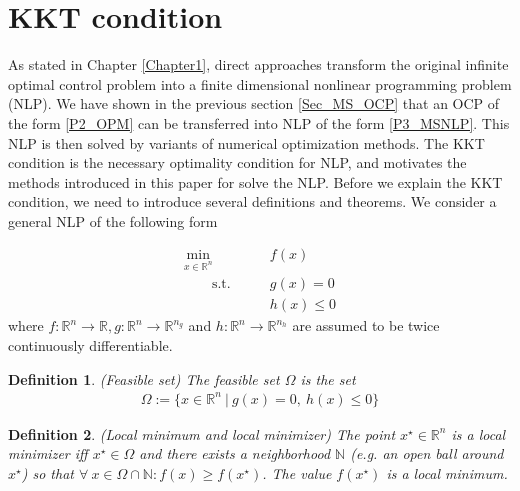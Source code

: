 \documentclass  [
  paper    = a4,
  BCOR     = 10mm,
  twoside,
  fontsize = 12pt,
  fleqn,
  toc      = bibnumbered,
  toc      = listofnumbered,
  numbers  = noendperiod,
  headings = normal,
  listof   = leveldown,
  version  = 3.03
]                                       {scrreprt}
\newcommand{\<}{\langle}
\renewcommand{\>}{\rangle}
\newtheorem{definition}{Definition}
\begin{document}
\section{KKT condition}
\label{Sec_KKT}
As stated in Chapter \ref{Chapter1}, direct approaches transform the original infinite optimal control problem into a finite dimensional nonlinear programming problem (NLP). We have shown in the previous section \ref{Sec_MS_OCP} that an OCP of the form \ref{P2_OPM} can be transferred into NLP of the form \ref{P3_MSNLP}. This NLP is then solved by variants of numerical optimization methods. The KKT condition is the necessary optimality condition for NLP, and motivates the methods introduced in this paper for solve the NLP. Before we explain the KKT condition, we need to introduce several definitions and theorems. We consider a general NLP of the following form
 

\begin{equation}
	\label{eq:OCP_discret_compact}
	\begin{aligned}
		\underset{x \in \mathbb{R}^n}{\text{min}} \qquad &f(x)\\
		\qquad \text{s.t.}\qquad&  g(x) = 0   \\
		&  h(x)\leq 0 
	\end{aligned}
\end{equation}
where $f: \mathbb{R}^n \rightarrow \mathbb{R}, g: \mathbb{R}^n \rightarrow \mathbb{R}^{n_g}$ and $h: \mathbb{R}^n \rightarrow \mathbb{R}^{n_h}$ are assumed to be twice continuously differentiable.

\begin{definition}(Feasible set) The feasible set $\Omega$ is the set 
	\begin{align}
		\Omega:= \{x \in \mathbb{R}^n \ | \ g(x)= 0 , \ h(x)\leq 0 \}
	\end{align}
\end{definition}

\begin{definition}(Local minimum and local minimizer) The point $x^\star \in \mathbb{R}^n$ is a local minimizer iff $x^\star \in  \Omega$ and there exists a neighborhood $\mathbb{N}$ (e.g. an open ball around $x^\star$) so that $ \forall \ x \in \Omega \cap \mathbb{N}: f(x) \geq f(x^\star)$. The value $f(x^\star)$ is a local minimum.
\end{definition}
\end{document}
